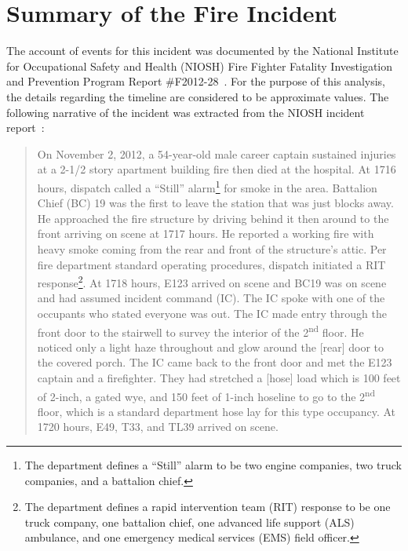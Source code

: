 \documentclass[12pt,oneside]{book}
\begin{document}
\chapter{Summary of the Fire Incident}
\label{fire_sum}
The account of events for this incident was documented by the National Institute for Occupational Safety and Health (NIOSH) Fire Fighter Fatality Investigation and Prevention Program Report \#F2012-28~\cite{NIOSH:Bowyer}. For the purpose of this analysis, the details regarding the timeline are considered to be approximate values. The following narrative of the incident was extracted from the NIOSH incident report~\cite{NIOSH:Bowyer}:
\begin{quote}
On November 2, 2012, a 54-year-old male career captain sustained injuries at a 2-1/2 story apartment building fire then died at the hospital. At 1716 hours, dispatch called a ``Still'' alarm\footnote{The department defines a ``Still'' alarm to be two engine companies, two truck companies, and a battalion chief.} for smoke in the area. Battalion Chief (BC) 19 was the first to leave the station that was just blocks away. He approached the fire structure by driving behind it then around to the front arriving on scene at 1717 hours. He reported a working fire with heavy smoke coming from the rear and front of the structure's attic. Per fire department standard operating procedures, dispatch initiated a RIT response\footnote{The department defines a rapid intervention team (RIT) response to be one truck company, one battalion chief, one advanced life support (ALS) ambulance, and one emergency medical services (EMS) field officer.}. At 1718 hours, E123 arrived on scene and BC19 was on scene and had assumed incident command (IC). The IC spoke with one of the occupants who stated everyone was out. The IC made entry through the front door to the stairwell to survey the interior of the 2\textsuperscript{nd} floor. He noticed only a light haze throughout and glow around the [rear] door to the covered porch. The IC came back to the front door and met the E123 captain and a firefighter. They had stretched a [hose] load which is 100 feet of 2-inch, a gated wye, and 150 feet of 1-inch hoseline to go to the 2\textsuperscript{nd} floor, which is a standard department hose lay for this type occupancy. At 1720 hours, E49, T33, and TL39 arrived on scene.


\end{quote}
\end{document}
